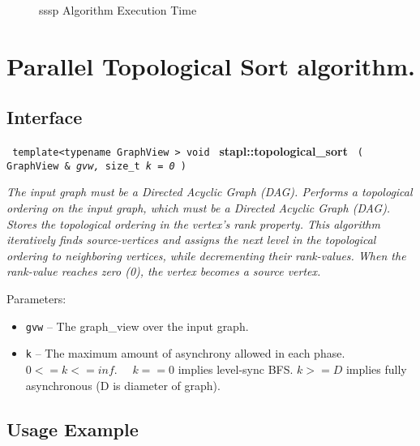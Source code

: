 \begin{figure}[p]
\caption{sssp Algorithm Execution Time}
\label{fig:sssp-alg-exec-exper}
\end{figure}


\section{Parallel Topological Sort algorithm.}
\label{sec-topsort-alg}

\subsection{Interface} \label{sec-topsort-alg-inter}

\noindent
\texttt{%
template<typename GraphView >
\newline
void 
}
\newline
\textbf{stapl::topological\_sort}%
\newline
\texttt{%
(   
GraphView \& 
\textit{gvw,}%
size\_t    
\textit{k = 0}%
)     
}
\vspace{0.4cm}

\textit{
The input graph must be a Directed Acyclic Graph (DAG). 
Performs a topological ordering on the input graph, which
must be a Directed Acyclic Graph (DAG). 
Stores the topological ordering in the vertex's rank property. This algorithm iteratively finds source-vertices and assigns the next level in the topological ordering to neighboring vertices, while decrementing their rank-values. When the rank-value reaches zero (0), the vertex becomes a source vertex.
}
\vspace{0.4cm}

Parameters:
\begin{itemize}
\item
\texttt{gvw} --
The graph\_view over the input graph.
\item
\texttt{k} --
The maximum amount of asynchrony allowed in each phase. $0 <= k <= inf.$ \ \ $k == 0$ implies level-sync BFS. $k >= D$ implies fully asynchronous (D is diameter of graph).
\end{itemize}

\subsection{Usage Example} \label{sec-topsort-alg-use}

